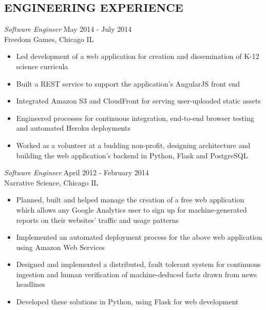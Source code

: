 \documentclass[line,margin]{res}
\begin{document}
\address{waltaskew@gmail.com}
\address{404-819-9796}

\begin{resume}

\section{ENGINEERING EXPERIENCE}
        {\sl Software Engineer} \hfill May 2014 - July 2014 \\
        Freedom Games, Chicago IL
        \begin{itemize}
          \item Led development of a web application for creation and
            dissemination of K-12 science curricula
          \item Built a REST service to support the application's AngularJS
            front end
            \item Integrated Amazon S3 and CloudFront for serving
              user-uploaded static assets
            \item Engineered processes for continuous integration, end-to-end
              browser testing and automated Heroku deployments
            \item Worked as a volunteer at a budding non-profit, designing
              architecture and building the web application's backend in
              Python, Flask and PostgreSQL
        \end{itemize}

        {\sl Software Engineer} \hfill April 2012 - February 2014 \\
        Narrative Science, Chicago IL
        \begin{itemize}
          \item Planned, built and helped manage the creation of a
            free web application which allows any Google Analytics
            user to sign up for machine-generated reports on their
            websites' traffic and usage patterns
          \item Implemented an automated deployment process for the
            above web application using Amazon Web Services
          \item Designed and implemented a distributed, fault tolerant
            system for continuous ingestion and human verification of
            machine-deduced facts drawn from news headlines
          \item Developed these solutions in Python, using Flask for
            web development
        \end{itemize}


\end{resume}
\end{document}
